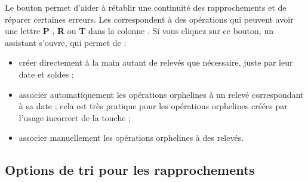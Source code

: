 
Le bouton  permet d'aider à rétablir une continuité des rapprochements et de réparer certaines erreurs. Les  correspondent à des opérations qui peuvent avoir une lettre \og \textbf{P} \fg{}, \og \textbf{R} \fg{} ou \og \textbf{T} \fg{} dans la colonne . Si vous cliquez sur ce bouton, un assistant s'ouvre, qui permet de  :

\begin{itemize}
	\item créer directement à la main autant de relevés que nécessaire, juste par leur date et soldes ;
	\item associer automatiquement les opérations orphelines à un relevé correspondant à sa date ; cela est très pratique pour les opérations orphelines créées par l'usage incorrect de la touche  ;
	\item associer manuellement les opérations orphelines à des relevés.
\end{itemize}


\subsection{Options de tri pour les rapprochements\label{setup-operations-sort}}

